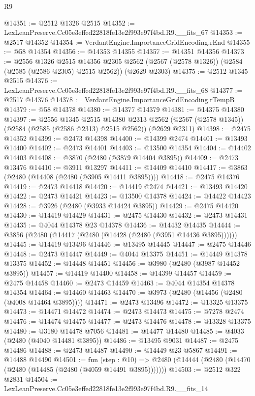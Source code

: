 \begin{lexlean}{R9}
\begin{coremodule}
@14351 := @2512 @1326 @2515
@14352 := LexLeanPreserve.Cc05e3effed22818fe13e2f993e97f4bd.R9.__fits_67
@14353 := @2517 @14352
@14354 := VerdantEngine.ImportanceGridEncoding.rEnd
@14355 := @58 @14354
@14356 := @14353 @14355
@14357 := @14351 @14356
@14373 := @2556
    @1326
    @2515
    @14356
    @2305
    @2562
    (@2567 (@2578 @1326))
    (@2584 (@2585 (@2586 @2305) @2515 @2562))
    (@2629 @2303)
@14375 := @2512 @1345 @2515
@14376 := LexLeanPreserve.Cc05e3effed22818fe13e2f993e97f4bd.R9.__fits_68
@14377 := @2517 @14376
@14378 := VerdantEngine.ImportanceGridEncoding.rTempB
@14379 := @58 @14378
@14380 := @14377 @14379
@14381 := @14375 @14380
@14397 := @2556
    @1345
    @2515
    @14380
    @2313
    @2562
    (@2567 (@2578 @1345))
    (@2584 (@2585 (@2586 @2313) @2515 @2562))
    (@2629 @2311)
@14398 := @2475 @14352
@14399 := @2473 @14398
@14400 := @14399 @2474
@14401 := @13493 @14400
@14402 := @2473 @14401
@14403 := @13500 @14354
@14404 := @14402 @14403
@14408 := @3870 (@2480 (@3879 @14404 @3895))
@14409 := @2473 @13476
@14410 := @3911 @13297
@14411 := @14409 @14410
@14417 := @3863 (@2480 (@14408 (@2480 (@3905 @14411 @3895))))
@14418 := @2475 @14376
@14419 := @2473 @14418
@14420 := @14419 @2474
@14421 := @13493 @14420
@14422 := @2473 @14421
@14423 := @13500 @14378
@14424 := @14422 @14423
@14428 := @3926 (@2480 (@3933 @14424 @3895))
@14429 := @2475 @14420
@14430 := @14419 @14429
@14431 := @2475 @14430
@14432 := @2473 @14431
@14435 := @4044 @14378 @23 @14378
@14436 := @14432 @14435
@14444 := @3856 (@2480 (@14417 (@2480 (@14428 (@2480 (@3951 @14436 @3895))))))
@14445 := @14419 @13496
@14446 := @13495 @14445
@14447 := @2475 @14446
@14448 := @2473 @14447
@14449 := @4044 @13375
@14451 := @14449 @14378 @13375
@14452 := @14448 @14451
@14456 := @3980 (@2480 (@3987 @14452 @3895))
@14457 := @14419 @14400
@14458 := @14399 @14457
@14459 := @2475 @14458
@14460 := @2473 @14459
@14463 := @4044 @14354 @14378 @14354
@14464 := @14460 @14463
@14470 := @3973 (@2480 (@14456 (@2480 (@4008 @14464 @3895))))
@14471 := @2473 @13496
@14472 := @13325 @13375
@14473 := @14471 @14472
@14474 := @2473 @14473
@14475 := @7278 @2474
@14476 := @14474 @14475
@14477 := @2473 @14476
@14478 := @13328 @13375
@14480 := @3180 @14478 @7056
@14481 := @14477 @14480
@14485 := @4033 (@2480 (@4040 @14481 @3895))
@14486 := @13495 @9031
@14487 := @2475 @14486
@14488 := @2473 @14487
@14490 := @14449 @23 @5867
@14491 := @14488 @14490
@14501 := fun (step : @10) =>
  @2480 (@14444 (@2480 (@14470 (@2480 (@14485 (@2480 (@4059 @14491 @3895)))))))
@14503 := @2512 @322 @2831
@14504 := LexLeanPreserve.Cc05e3effed22818fe13e2f993e97f4bd.R9.__fits_14

\end{coremodule}
\end{lexlean}
